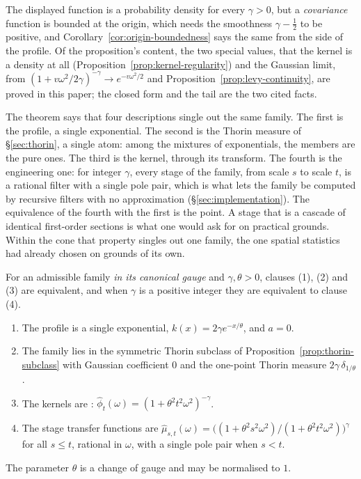 The displayed function is a probability density for every
$\gamma > 0$, but a \Matern{} \emph{covariance} function is bounded at the origin, which needs
the smoothness $\gamma - \tfrac12$ to be positive, and Corollary~\ref{cor:origin-boundedness}
says the same from the side of the profile. Of the proposition's content, the two special
values, that the kernel is a density at all (Proposition~\ref{prop:kernel-regularity}) and the
Gaussian limit, from $(1 + v\omega^2/2\gamma)^{-\gamma} \to e^{-v\omega^2/2}$ and
Proposition~\ref{prop:levy-continuity}, are proved in this paper; the closed form and the tail
are the two cited facts.

The theorem says that four descriptions single out the same family. The first is the profile,
a single exponential. The second is the Thorin measure of \S\ref{sec:thorin}, a single atom:
among the mixtures of exponentials, the \Matern{} members are the pure ones. The third is the
kernel, through its transform. The fourth is the engineering one: for integer $\gamma$, every
stage of the family, from scale $s$ to scale $t$, is a rational filter with a single pole
pair, which is what lets the family be computed by recursive filters with no approximation
(\S\ref{sec:implementation}). The equivalence of the fourth with the first is the point. A
stage that is a cascade of identical first-order sections is what one would ask for on
practical grounds. Within the cone that property singles out one family, the one spatial
statistics had already chosen on grounds of its own.

\begin{theorem}\label{thm:matern}
For an admissible family \emph{in its canonical gauge} and $\gamma, \theta > 0$, clauses (1), (2)
and (3) are equivalent, and
when $\gamma$ is a positive integer they are equivalent to clause (4).
\begin{enumerate}
\item The profile is a single exponential, $k(x) = 2\gamma e^{-x/\theta}$, and $a = 0$.
\item The family lies in the symmetric Thorin subclass of
Proposition~\ref{prop:thorin-subclass} with
Gaussian coefficient $0$ and the one-point Thorin measure $2\gamma\,\delta_{1/\theta}$.
\item The kernels are \Matern{}: $\hat\phi_t(\omega) = (1 + \theta^2t^2\omega^2)^{-\gamma}$.
\item The stage transfer functions are $\hat\mu_{s,t}(\omega) =
\bigl((1 + \theta^2s^2\omega^2)/(1 + \theta^2t^2\omega^2)\bigr)^{\gamma}$ for all $s \le t$,
rational in $\omega$, with a single pole pair when $s < t$.
\end{enumerate}
The parameter $\theta$ is a change of gauge and may be normalised to $1$.
\end{theorem}

